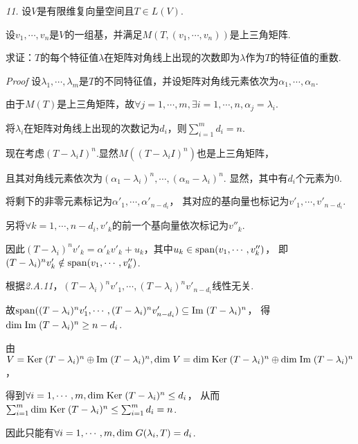 \hspace*{\fill}

\textit{11.}
设\(V\)是有限维复向量空间且\(T \in L(V)\).

设\(v_1,\cdots,v_n\)是\(V\)的一组基，并满足\(M(T,(v_1,\cdots,v_n))\)是上三角矩阵.

求证：\(T\)的每个特征值\(\lambda\)在矩阵对角线上出现的次数即为\(\lambda\)作为\(T\)的特征值的重数.

\textit{Proof}
设\(\lambda_1,\cdots,\lambda_m\)是\(T\)的不同特征值，并设矩阵对角线元素依次为\(\alpha_1,\cdots,\alpha_n\).

由于\(M(T)\)是上三角矩阵，故\(\forall j=1,\cdots,m,\exists i=1,\cdots,n,\alpha_j=\lambda_i\).

将\(\lambda_i\)在矩阵对角线上出现的次数记为\(d_i\)，则\(\sum_{i=1}^m d_i=n\).

现在考虑\((T-\lambda_i I)^n\).显然\(M((T-\lambda_i I)^n)\)也是上三角矩阵，

且其对角线元素依次为\((\alpha_1-\lambda_i)^n,\cdots,(\alpha_n-\lambda_i)^n\).
显然，其中有\(d_i\)个元素为\(0\).

将剩下的非零元素标记为\(\alpha'_1,\cdots,\alpha'_{n-d_i}\)，
其对应的基向量也标记为\(v'_1,\cdots,v'_{n-d_i}\).

另将\(\forall k=1,\cdots,n-d_i,v'_k\)的前一个基向量依次标记为\(v''_k\).

因此\((T-\lambda_i)^n v'_k=\alpha'_kv'_k+u_k\)，其中\(u_k \in \mathrm{span} (v_1,\cdots,v''_k)\)，
即\((T-\lambda_i)^n v'_k \notin \mathrm{span} (v_1,\cdots,v''_k)\).

根据\textit{2.A.11}，\((T-\lambda_i)^n v'_1,\cdots,(T-\lambda_i)^n v'_{n-d_i}\)线性无关.

故\(\mathrm{span} ((T-\lambda_i)^n v'_1,\cdots,(T-\lambda_i)^n v'_{n-d_i}) \subseteq \mathrm{Im \;} (T-\lambda_i)^n\)，
得\(\mathrm{dim \;} \mathrm{Im \;} (T-\lambda_i)^n \geq n-d_i\).

由$V=\mathrm{Ker \;} (T-\lambda_i)^n \oplus \mathrm{Im \;} (T-\lambda_i)^n,
\mathrm{dim \;} V=\mathrm{dim \;} \mathrm{Ker \;} (T-\lambda_i)^n \oplus \mathrm{dim \;} \mathrm{Im \;} (T-\lambda_i)^n$，

得到\(\forall i=1,\cdots,m,\mathrm{dim \;} \mathrm{Ker \;} (T-\lambda_i)^n \leq d_i\)，
从而\(\sum_{i=1}^m \mathrm{dim \;} \mathrm{Ker \;} (T-\lambda_i)^n \leq \sum_{i=1}^m d_i=n\).

因此只能有\(\forall i=1,\cdots,m,\mathrm{dim \;} G(\lambda_i,T)=d_i\).

